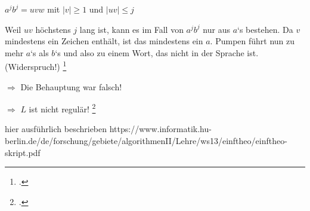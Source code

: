 \documentclass{lehramt-informatik-haupt}
\begin{document}
\begin{center}
$a^j b^j = uvw$ mit $|v| \geq 1$ und $|uv| \leq j$
\end{center}

\noindent
Weil $uv$ höchstens $j$ lang ist, kann es im Fall von $a^j b^j$ nur aus
$a$‘s bestehen. Da $v$ mindestens ein Zeichen enthält, ist das
mindestens ein $a$. Pumpen führt nun zu mehr $a$‘s als $b$‘s und also zu
einem Wort, das nicht in der Sprache ist. (Widerspruch!)
\footcite{wiki:pumping}

$\Rightarrow$ Die Behauptung war falsch!

$\Rightarrow$ $L$ ist nicht regulär!
\footcite[Seite 63-64]{theo:fs:1}

hier ausführlich beschrieben https://www.informatik.hu-berlin.de/de/forschung/gebiete/algorithmenII/Lehre/ws13/einftheo/einftheo-skript.pdf

\literatur
\end{document}
